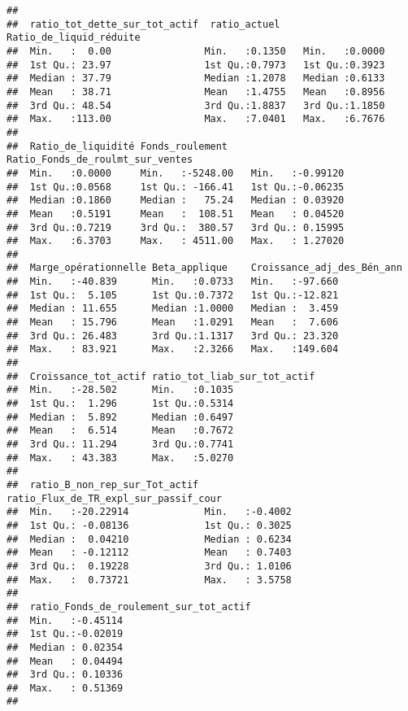 \documentclass[
]{article}
\begin{document}
\begin{verbatim}
##                                                       
##  ratio_tot_dette_sur_tot_actif  ratio_actuel    Ratio_de_liquid_réduite
##  Min.   :  0.00                Min.   :0.1350   Min.   :0.0000         
##  1st Qu.: 23.97                1st Qu.:0.7973   1st Qu.:0.3923         
##  Median : 37.79                Median :1.2078   Median :0.6133         
##  Mean   : 38.71                Mean   :1.4755   Mean   :0.8956         
##  3rd Qu.: 48.54                3rd Qu.:1.8837   3rd Qu.:1.1850         
##  Max.   :113.00                Max.   :7.0401   Max.   :6.7676         
##                                                                        
##  Ratio_de_liquidité Fonds_roulement    Ratio_Fonds_de_roulmt_sur_ventes
##  Min.   :0.0000     Min.   :-5248.00   Min.   :-0.99120                
##  1st Qu.:0.0568     1st Qu.: -166.41   1st Qu.:-0.06235                
##  Median :0.1860     Median :   75.24   Median : 0.03920                
##  Mean   :0.5191     Mean   :  108.51   Mean   : 0.04520                
##  3rd Qu.:0.7219     3rd Qu.:  380.57   3rd Qu.: 0.15995                
##  Max.   :6.3703     Max.   : 4511.00   Max.   : 1.27020                
##                                                                        
##  Marge_opérationnelle Beta_applique    Croissance_adj_des_Bén_ann
##  Min.   :-40.839      Min.   :0.0733   Min.   :-97.660           
##  1st Qu.:  5.105      1st Qu.:0.7372   1st Qu.:-12.821           
##  Median : 11.655      Median :1.0000   Median :  3.459           
##  Mean   : 15.796      Mean   :1.0291   Mean   :  7.606           
##  3rd Qu.: 26.483      3rd Qu.:1.1317   3rd Qu.: 23.320           
##  Max.   : 83.921      Max.   :2.3266   Max.   :149.604           
##                                                                  
##  Croissance_tot_actif ratio_tot_liab_sur_tot_actif
##  Min.   :-28.502      Min.   :0.1035              
##  1st Qu.:  1.296      1st Qu.:0.5314              
##  Median :  5.892      Median :0.6497              
##  Mean   :  6.514      Mean   :0.7672              
##  3rd Qu.: 11.294      3rd Qu.:0.7741              
##  Max.   : 43.383      Max.   :5.0270              
##                                                   
##  ratio_B_non_rep_sur_Tot_actif ratio_Flux_de_TR_expl_sur_passif_cour
##  Min.   :-20.22914             Min.   :-0.4002                      
##  1st Qu.: -0.08136             1st Qu.: 0.3025                      
##  Median :  0.04210             Median : 0.6234                      
##  Mean   : -0.12112             Mean   : 0.7403                      
##  3rd Qu.:  0.19228             3rd Qu.: 1.0106                      
##  Max.   :  0.73721             Max.   : 3.5758                      
##                                                                     
##  ratio_Fonds_de_roulement_sur_tot_actif
##  Min.   :-0.45114                      
##  1st Qu.:-0.02019                      
##  Median : 0.02354                      
##  Mean   : 0.04494                      
##  3rd Qu.: 0.10336                      
##  Max.   : 0.51369                      
## 
\end{verbatim}
\end{document}
